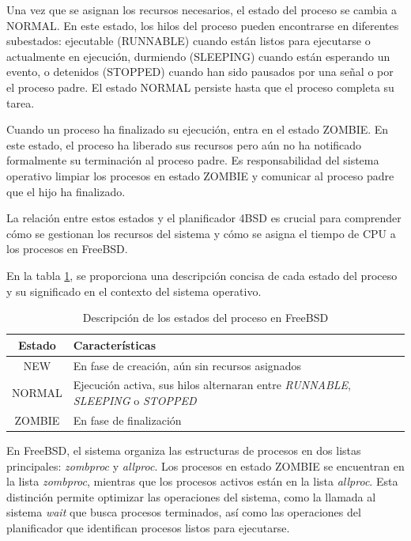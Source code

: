 Una vez que se asignan los recursos necesarios, el estado del proceso se cambia a NORMAL. En este estado, los hilos del proceso pueden encontrarse en diferentes subestados: ejecutable (RUNNABLE) cuando están listos para ejecutarse o actualmente en ejecución, durmiendo (SLEEPING) cuando están esperando un evento, o detenidos (STOPPED) cuando han sido pausados por una señal o por el proceso padre. El estado NORMAL persiste hasta que el proceso completa su tarea.

Cuando un proceso ha finalizado su ejecución, entra en el estado ZOMBIE. En este estado, el proceso ha liberado sus recursos pero aún no ha notificado formalmente su terminación al proceso padre. Es responsabilidad del sistema operativo limpiar los procesos en estado ZOMBIE y comunicar al proceso padre que el hijo ha finalizado.

La relación entre estos estados y el planificador 4BSD es crucial para comprender cómo se gestionan los recursos del sistema y cómo se asigna el tiempo de CPU a los procesos en FreeBSD.

En la tabla \ref{tabla:estados-proceso}, se proporciona una descripción concisa de cada estado del proceso y su significado en el contexto del sistema operativo.

\begin{table}[H]
    \centering
    \begin{tabular}{|c|l|}
        \hline
        \textbf{Estado} & \textbf{Características} \\
        \hline
        NEW & En fase de creación, aún sin recursos asignados \\
        \hline
        NORMAL & Ejecución activa, sus hilos alternaran entre \textit{RUNNABLE}, \textit{SLEEPING} o \textit{STOPPED} \\
        \hline
        ZOMBIE & En fase de finalización \\
        \hline
    \end{tabular}
    \caption{Descripción de los estados del proceso en FreeBSD}
    \label{tabla:estados-proceso}
\end{table}

En FreeBSD, el sistema organiza las estructuras de procesos en dos listas principales: \textit{zombproc} y \textit{allproc}. Los procesos en estado ZOMBIE se encuentran en la lista \textit{zombproc}, mientras que los procesos activos están en la lista \textit{allproc}. Esta distinción permite optimizar las operaciones del sistema, como la llamada al sistema \textit{wait} que busca procesos terminados, así como las operaciones del planificador que identifican procesos listos para ejecutarse.


